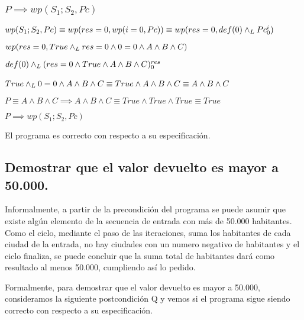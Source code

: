 \documentclass[10pt,a4paper]{article}
\begin{document}
\subsubsection{$P \implies wp(S_{1};S_{2}, Pc)$}
$wp(S_{1};S_{2}, Pc) \equiv wp(res = 0, wp(i = 0, Pc)) \equiv wp(res = 0, def(0) \land _L Pc_{0}^{i})$ \equiv \par
\vspace{5px}
$wp(res = 0, True \land _L res = 0 \wedge 0 = 0 \wedge A \wedge B \wedge C) $ \equiv \par
\vspace{5px}
$def(0) \land _L (res = 0 \wedge True \wedge A \wedge B \wedge C)_{0}^{res} $ \equiv \par
\vspace{5px}
$True \land _L 0 = 0 \wedge A \wedge B \wedge C \equiv True \wedge A \wedge B \wedge C \equiv  A \wedge B \wedge C $ \ \par
\vspace{20px}
$P \equiv A \wedge B \wedge C \implies A \wedge B \wedge C \equiv True \wedge True \wedge True \equiv True$ \par
\vspace{5px}
\begin{center}
    $P \implies wp(S_{1};S_{2}, Pc)$
\end{center}
El programa es correcto con respecto a su especificación.

\subsection{Demostrar que el valor devuelto es mayor a 50.000.}
Informalmente, a partir de la precondición del programa se puede asumir que existe algún elemento de la secuencia de entrada con más de 50.000 habitantes. Como el ciclo, mediante el paso de las iteraciones, suma los habitantes de cada ciudad de la entrada, no hay ciudades con un numero negativo de habitantes y el ciclo finaliza, se puede concluir que la suma total de habitantes dará como resultado al menos 50.000, cumpliendo así lo pedido. \par
Formalmente, para demostrar que el valor devuelto es mayor a 50.000, consideramos la siguiente postcondición Q y vemos si el programa sigue siendo correcto con respecto a su especificación.
\end{document}
